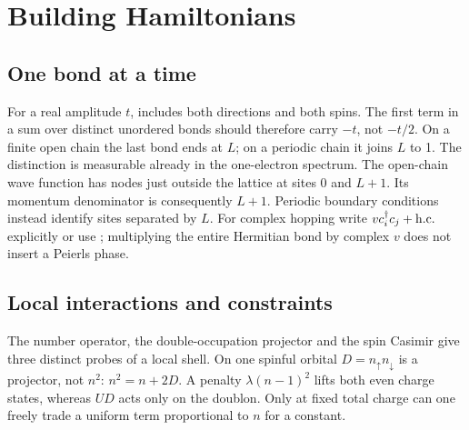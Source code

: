 \chapter{Building Hamiltonians}
\section{One bond at a time}
For a real amplitude $t$,  includes both
directions and both spins. The first term in a sum over distinct
unordered bonds should therefore carry $-t$, not $-t/2$. On a finite
open chain the last bond ends at $L$; on a periodic chain it joins
$L$ to 1. The distinction is measurable already in the one-electron
spectrum.
The open-chain wave function has nodes just outside the lattice at
sites 0 and $L+1$. Its momentum denominator is consequently $L+1$.
Periodic boundary conditions instead identify sites separated by $L$.
For complex hopping write $v c_i^\dagger c_j+\mathrm{h.c.}$ explicitly or use
; multiplying the entire Hermitian bond by complex $v$
does not insert a Peierls phase.

\section{Local interactions and constraints}
The number operator, the double-occupation projector and the spin
Casimir give three distinct probes of a local shell. On one spinful
orbital $D=n_\uparrow n_\downarrow$ is a projector, not $n^2$:
$n^2=n+2D$. A penalty $\lambda(n-1)^2$ lifts both even charge states,
whereas $UD$ acts only on the doublon. Only at fixed total charge
can one freely trade a uniform term proportional to $n$ for a constant.

